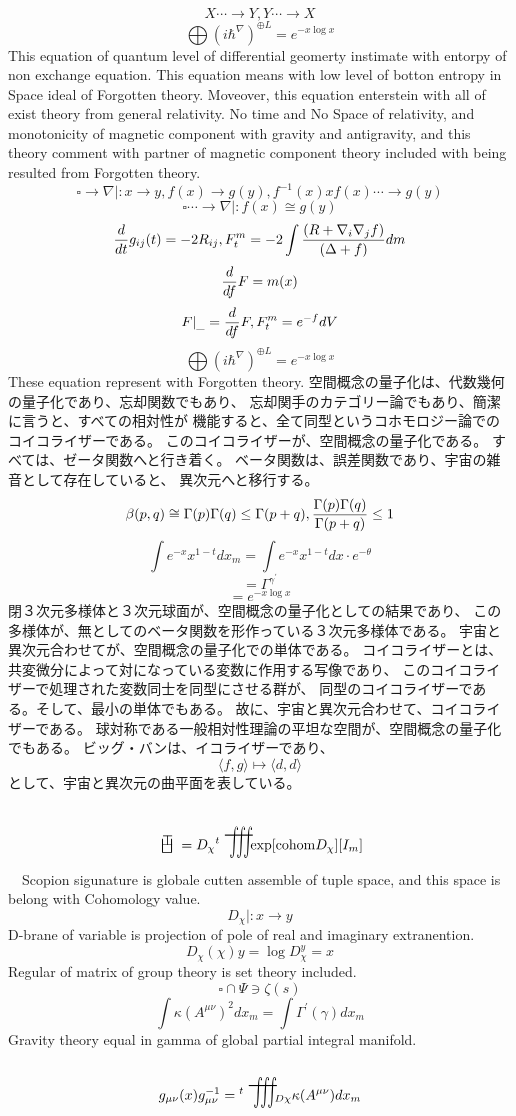 \documentclass{jsarticle}
\begin{document}
   $$ X \dotsi \to Y, Y \dotsi \to X $$
   $$ \bigoplus(i \hbar^{\nabla})^{\oplus L} = e^{-x \log x} $$
   This equation of quantum level of differential geomerty
   instimate with entorpy of non exchange equation.
   This equation means with low level of botton entropy in Space ideal of
   Forgotten theory. Moveover, this equation enterstein with all of exist
   theory from general relativity.
   No time and No Space of relativity, and monotonicity of magnetic component
   with gravity and antigravity, and this theory comment with partner of
   magnetic component theory included with being resulted from Forgotten
   theory.
   $$ \square \to \nabla |: x \to y, f(x) \to g(y), f^{-1}(x)xf(x) 
   \dotsi \to g(y) $$
   $$ \square \dotsi \to \nabla |: f(x) \cong g(y) $$
   $$ {d \over dt}g_{ij}(t) = - 2 R_{ij}, F^m_t = -2\int{{(R + \nabla_i \nabla
   _j f)} \over {(\Delta + f)}}dm $$
   $$ {d \over df}F = m(x) $$
   $$ F|_{\_} = {d \over df}F, F^m_t = e^{-f}dV $$
   $$ \bigoplus(i \hbar^{\nabla})^{\oplus L} = e^{-x \log x} $$
   These equation represent with Forgotten theory.
   空間概念の量子化は、代数幾何の量子化であり、忘却関数でもあり、
   忘却関手のカテゴリー論でもあり、簡潔に言うと、すべての相対性が
   機能すると、全て同型というコホモロジー論でのコイコライザーである。
   このコイコライザーが、空間概念の量子化である。
   すべては、ゼータ関数へと行き着く。
   ベータ関数は、誤差関数であり、宇宙の雑音として存在していると、
   異次元へと移行する。
   $$ \beta(p,q) \cong {\Gamma(p)\Gamma(q) \le \Gamma(p+q)}, 
   {{\Gamma(p)\Gamma(q)} \over \Gamma(p+q)} \le 1 $$
   $$ \int e^{-x}x^{1-t}dx_m = \int e^{-x}x^{1-t}dx\cdot e^{-\theta} $$
   $$ = \Gamma^{{\gamma}^{'}} $$
   $$ = e^{-x \log x} $$
   閉３次元多様体と３次元球面が、空間概念の量子化としての結果であり、
   この多様体が、無としてのベータ関数を形作っている３次元多様体である。
   宇宙と異次元合わせてが、空間概念の量子化での単体である。
   コイコライザーとは、共変微分によって対になっている変数に作用する写像であり、
   このコイコライザーで処理された変数同士を同型にさせる群が、
   同型のコイコライザーである。そして、最小の単体でもある。
   故に、宇宙と異次元合わせて、コイコライザーである。
   球対称である一般相対性理論の平坦な空間が、空間概念の量子化でもある。
   ビッグ・バンは、イコライザーであり、
   $$ \langle f,g\rangle \mapsto \langle d,d\rangle $$
   として、宇宙と異次元の曲平面を表している。


$$ \dazanier = D_{\chi}{}^{t}\scalebox{1.0}[2]{\variiint}
\mathrm{exp}{[{\mathrm{cohom}}D_{\chi}]}[I_m] $$ 

　Scopion sigunature is globale cutten assemble of tuple space,
and this space is belong with Cohomology value.
$$ D_{\chi} |: x \to y $$
D-brane of variable is projection of pole of real and imaginary extranention.
$$ D_{\chi}(\chi)y = \log D_{\chi}^{y} = x $$
Regular of matrix of group theory is set theory included.
$$ \square \cap \Psi \ni  \zeta(s) $$
$$ \int \kappa (A^{\mu\nu})^{2}dx_m = \int \Gamma^{'}(\gamma)dx_m $$
Gravity theory equal in gamma of global partial integral manifold.
$$ g_{\mu\nu}(x)g^{-1}_{\mu\nu} = {}^{t}\scalebox{1.0}[2]{\variiint}_{D\chi}
\kappa (A^{\mu\nu})dx_m $$
\end{document}
